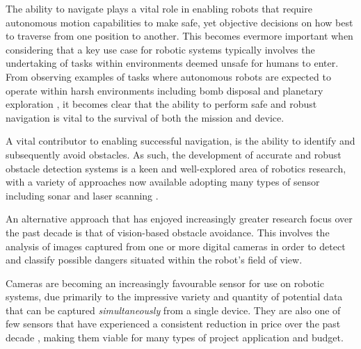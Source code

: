   The ability to navigate plays a vital role in enabling robots that require autonomous motion capabilities to make safe, yet objective decisions on how best to traverse from one position to another. This becomes evermore important when considering that a key use case for robotic systems typically involves the undertaking of tasks within environments deemed unsafe for humans to enter. From observing examples of tasks where autonomous robots are expected to operate within harsh environments including bomb disposal and planetary exploration \cite{maimone2007two}, it becomes clear that the ability to perform safe and robust navigation is vital to the survival of both the mission and device.


A vital contributor to enabling successful navigation, is the ability to identify and subsequently avoid obstacles. As such, the development of accurate and robust obstacle detection systems is a keen and well-explored area of robotics research, with a variety of approaches now available adopting many types of sensor including sonar \cite{williamson} and laser scanning \cite{wyeth}. 

An alternative approach that has enjoyed increasingly greater research focus over the past decade is that of vision-based obstacle avoidance. This involves the analysis of images captured from one or more digital cameras in order to detect and classify possible dangers situated within the robot's field of view. 

Cameras are becoming an increasingly favourable sensor for use on robotic systems, due primarily to the impressive variety and quantity of potential data that can be captured \textit{simultaneously} from a single device. They are also one of few sensors that have experienced a consistent reduction in price over the past decade \cite{campbell}, making them viable for many types of project application and budget. 

